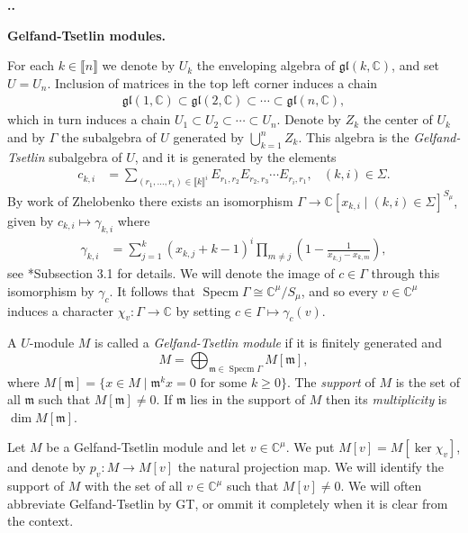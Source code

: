 \documentclass[11pt,fleqn]{amsart}
\renewcommand\thesection{\arabic{section}}
\newcounter{para}[section]
\renewcommand\thepara{\thesection.\arabic{para}}
\def\paragraph{%
 \noindent
 \refstepcounter{para}%
 \textbf{\thepara.}\hspace{1ex}%
}
\newcommand\about[1]{%
 {\bfseries#1.}%
}
\newcommand\CC{\mathbb C}
\renewcommand\to{\rightarrow}
\newcommand\m{\mathfrak m}
\newcommand\gl{\mathfrak{gl}}
\newcommand\interval[1]{\llbracket #1 \rrbracket}
\DeclareMathOperator\Specm{Specm}
\begin{document}
\paragraph
\about{Gelfand-Tsetlin modules}
For each $k \in \interval{n}$ we denote by $U_k$ the enveloping algebra of 
$\gl(k,\CC)$, and set $U = U_n$. Inclusion of matrices in the top left corner 
induces a chain
\begin{align*}
\gl(1,\CC) \subset \gl(2, \CC) \subset \cdots \subset \gl(n,\CC),
\end{align*}
which in turn induces a chain $U_1 \subset U_2 \subset \cdots \subset U_n$. 
Denote by $Z_k$ the center of $U_k$ and by $\Gamma$ the subalgebra of $U$ 
generated by $\bigcup_{k=1}^n Z_k$. This algebra is the \emph{Gelfand-Tsetlin} 
subalgebra of $U$, and it is generated by the elements
\begin{align*}
c_{k,i}
  &= \sum_{(r_1, \ldots, r_i) \in \interval{k}^i} 
    E_{r_1, r_2} E_{r_2, r_3} \cdots E_{r_i, r_1},
  & (k,i) \in \Sigma.
\end{align*}
By work of Zhelobenko there exists an isomorphism $\Gamma \to \CC[x_{k,i} 
\mid (k,i) \in \Sigma]^{S_\mu}$, given by $c_{k,i} \mapsto 
\gamma_{k,i}$ where
\begin{align*}
\gamma_{k,i}
  &= \sum_{j=1}^k (x_{k,j} + k - 1)^i 
    \prod_{m \neq j} \left( 
      1 - \frac{1}{x_{k,j} - x_{k,m}}
    \right),
\end{align*}
see \cite{FGR16}*{Subsection 3.1} for details. We will denote the image of 
$c \in \Gamma$ through this isomorphism by $\gamma_c$.
It follows that $\Specm \Gamma \cong \CC^\mu / S_\mu$, and so every 
$v \in \CC^\mu$ induces a character $\chi_v: \Gamma \to \CC$ by setting
$c \in \Gamma \mapsto \gamma_c(v)$. 
\begin{Definition*}
A $U$-module $M$ is called a \emph{Gelfand-Tsetlin module} if it is finitely
generated and
\[
  M = \bigoplus_{\m \in \Specm \Gamma} M[\mathfrak m],
\] 
where $M[\mathfrak m] = \{x \in M \mid \mathfrak m^k x = 0 \mbox{ for some } k 
\geq 0\}$. The \emph{support} of $M$ is the set of all $\m$ such that $M[\m]
\neq 0$. If $\m$ lies in the support of $M$ then its \emph{multiplicity} is
$\dim M[\m]$.
\end{Definition*}
Let $M$ be a Gelfand-Tsetlin module and let $v \in \CC^\mu$. We put
$M[v] = M[\ker \chi_v]$, and denote by $p_v: M \to M[v]$ the natural projection
map. We will identify the support of $M$ with the set of all $v \in \CC^\mu$ 
such that $M[v] \neq 0$. We will often abbreviate Gelfand-Tsetlin by GT, or 
ommit it completely when it is clear from the context.
\end{document}
